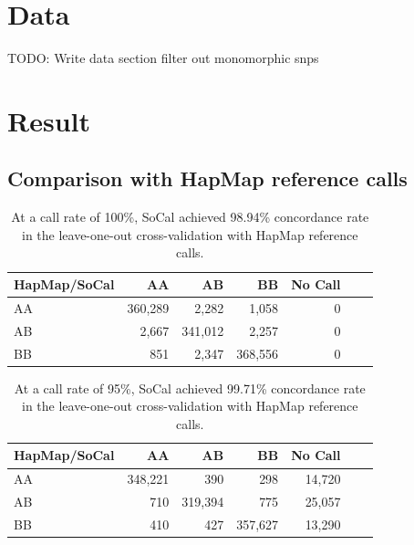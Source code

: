 \documentclass{scrartcl}
\begin{document}

\section{Data}
TODO: Write data section
filter out monomorphic snps












\section{Result}

\subsection{Comparison with HapMap reference calls}

\begin{table}[H]
\centering
\begin{tabular}{l*{5}{r}r}
    \hline
    HapMap/SoCal  & AA       & AB      & BB      & No Call \\ \hline
    AA            & 360,289  & 2,282   & 1,058   & 0  \\
    AB            & 2,667    & 341,012 & 2,257   & 0  \\
    BB            & 851      & 2,347   & 368,556 & 0  \\ \hline
\end{tabular}
\caption{At a call rate of 100\%, SoCal achieved 98.94\% concordance rate
in the leave-one-out cross-validation with HapMap reference calls.}
\label{table:cmp_hapmap_socal}
\end{table}

\begin{table}[H]
\centering
\begin{tabular}{l*{5}{r}r}
    \hline
    HapMap/SoCal  & AA       & AB      & BB      & No Call \\ \hline
    AA            & 348,221  & 390     & 298     & 14,720  \\
    AB            & 710      & 319,394 & 775     & 25,057  \\
    BB            & 410      & 427     & 357,627 & 13,290  \\ \hline
\end{tabular}
\caption{At a call rate of 95\%, SoCal achieved 99.71\% concordance rate
in the leave-one-out cross-validation with HapMap reference calls.}
\label{table:cmp_hapmap_socal}
\end{table}
\end{document}
